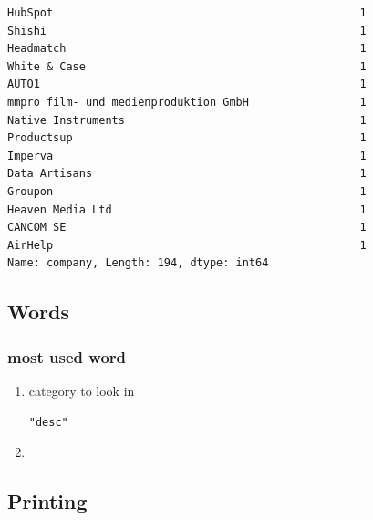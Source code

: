 \documentclass[11pt]{article}
\begin{document}
\begin{enumerate}
\begin{verbatim}
HubSpot                                               1
Shishi                                                1
Headmatch                                             1
White & Case                                          1
AUTO1                                                 1
mmpro film- und medienproduktion GmbH                 1
Native Instruments                                    1
Productsup                                            1
Imperva                                               1
Data Artisans                                         1
Groupon                                               1
Heaven Media Ltd                                      1
CANCOM SE                                             1
AirHelp                                               1
Name: company, Length: 194, dtype: int64
\end{verbatim}
\end{enumerate}

\subsection{Words}
\label{sec:org5a487f8}
\subsubsection{most used word}
\label{sec:org632f638}
\begin{enumerate}
\item category to look in
\label{sec:org1418b88}
\begin{verbatim}
"desc"
\end{verbatim}

\item 
\label{sec:orgde6e545}
\end{enumerate}
\subsection{Printing}
\label{sec:org7801a63}
\end{document}
